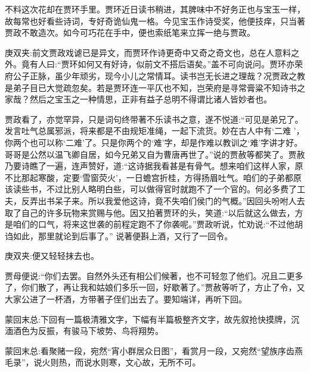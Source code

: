 \begin{parag}
    不料这次花却在贾环手里。贾环近日读书稍进，其脾味中不好务正也与宝玉一样，故每常也好看些诗词，专好奇诡仙鬼一格。今见宝玉作诗受奖，他便技痒，只当著贾政不敢造次。如今可巧花在手中，便也索纸笔来立挥一绝与贾政。\begin{note}庚双夹:前文贾政戏谑已是异文，而贾环作诗更奇中又奇之奇文也，总在人意料之外。竟有人曰:“贾环如何又有好诗，似前文不搭后语矣。”盖不可向说问。贾环亦荣府公子正脉，虽少年顽劣，现今小儿之常情耳。读书岂无长进之理哉？况贾政之教是弟子目已大觉疏忽矣。若是贾环连一平仄也不知，岂荣府是寻常膏粱不知诗书之家哉？然后之宝玉之一种情思，正非有益子总明不得谓比诸人皆妙者也。\end{note}贾政看了，亦觉罕异，只是词句终带著不乐读书之意，遂不悦道:“可见是弟兄了。发言吐气总属邪派，将来都是不由规矩准绳，一起下流货。妙在古人中有‘二难 ’，你两个也可以称‘二难’了。只是你两个的‘难’字，却是作难以教训之‘难’字讲才好。哥哥是公然以温飞卿自居，如今兄弟又自为曹唐再世了。”说的贾赦等都笑了。贾赦乃要诗瞧了一遍，连声赞好，道:“这诗据我看甚是有骨气。想来咱们这样人家，原不比那起寒酸，定要‘雪窗荧火’，一日蟾宫折桂，方得扬眉吐气。咱们的子弟都原该读些书，不过比别人略明白些，可以做得官时就跑不了一个官的。何必多费了工夫，反弄出书呆子来。所以我爱他这诗，竟不失咱们侯门的气概。”因回头吩咐人去取了自己的许多玩物来赏赐与他。因又拍著贾环的头，笑道:“以后就这么做去，方是咱们的口气，将来这世袭的前程定跑不了你袭呢。”贾政听说，忙劝说:“不过他胡诌如此，那里就论到后事了。” 说著便斟上酒，又行了一回令。\begin{note}庚双夹:便又轻轻抹去也。\end{note}贾母便说:“你们去罢。自然外头还有相公们候著，也不可轻忽了他们。况且二更多了，你们散了，再让我和姑娘们多乐一回，好歇著了。”贾赦等听了，方止了令，又大家公进了一杯酒，方带著子侄们出去了。要知端详，再听下回。
\end{parag}


\begin{parag}
    \begin{note}蒙回末总:下回有一篇极清雅文字，下幅有半篇极整齐文字，故先叙抢快摸牌，沉湎酒色为反振，有骏马下坡势、鸟将翔势。\end{note}
\end{parag}


\begin{parag}
    \begin{note}蒙回末总:看聚赌一段，宛然“宵小群居众日图”，看赏月一段，又宛然“望族序齿燕毛录”，说火则热，而说水则寒，文心故，无所不可。\end{note}
\end{parag}

